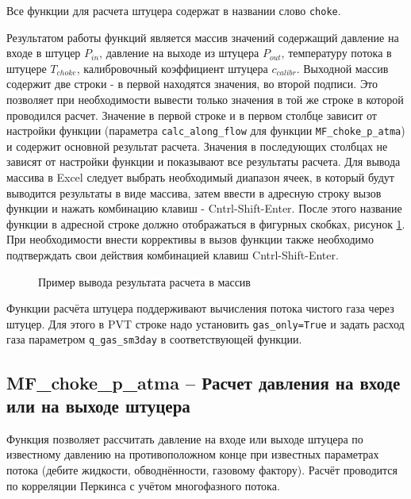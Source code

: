 Все функции для расчета штуцера содержат в названии слово \texttt{choke}. 
 
Результатом работы функций является массив значений содержащий давление на входе в штуцер $P_{in}$, давление на выходе из штуцера $P_{out}$, температуру потока в штуцере $T_{choke}$, калибровочный коэффициент штуцера $c_{calibr}$.  Выходной массив содержит две строки - в первой находятся значения, во второй подписи. Это позволяет при необходимости вывести только значения в той же строке в которой проводился расчет. Значение в первой строке и в первом столбце зависит от настройки функции (параметра \texttt{calc_along_flow} для функции \texttt{MF_choke_p_atma}) и содержит основной результат расчета. Значения в последующих столбцах не зависят от настройки функции и показывают все результаты расчета.
Для вывода массива в Excel следует выбрать необходимый диапазон ячеек, в который будут выводится результаты в виде массива, затем ввести в адресную строку вызов функции и нажать комбинацию клавиш - Cntrl-Shift-Enter. После этого название функции в адресной строке должно отображаться в фигурных скобках, рисунок \ref{ris:choke_array_out}. При необходимости внести коррективы в вызов функции также необходимо подтверждать свои действия комбинацией клавиш Cntrl-Shift-Enter.


\begin{figure}[ht]
	\caption{Пример вывода результата расчета в массив}
	\label{ris:choke_array_out}
\end{figure}

Функции расчёта штуцера поддерживают вычисления потока чистого газа через штуцер. Для этого в PVT строке надо установить \texttt{gas_only=True} и задать расход газа параметром \texttt{q_gas_sm3day} в соответствующей функции. 

\subsection{MF\_choke\_p\_atma – Расчет давления на входе или на выходе штуцера}
Функция позволяет рассчитать давление на входе или выходе штуцера по известному давлению на противоположном конце при известных параметрах потока (дебите жидкости, обводнённости, газовому фактору). Расчёт проводится по корреляции Перкинса \cite{Perkins_1993} с учётом многофазного потока. 
 

